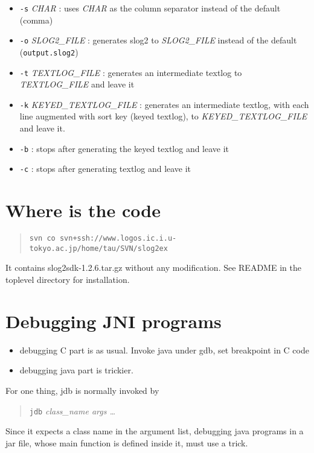 \documentclass{article}
\begin{document}
\begin{itemize}
\item {\tt -s} {\it CHAR} : uses {\it CHAR} as the column separator instead of the default (comma)
\item {\tt -o} {\it SLOG2\_FILE} : generates slog2 to {\it SLOG2\_FILE}
instead of the default ({\tt output.slog2})
\item {\tt -t} {\it TEXTLOG\_FILE} : generates an intermediate textlog to {\it TEXTLOG\_FILE} and leave it
\item {\tt -k} {\it KEYED\_TEXTLOG\_FILE} : generates an intermediate textlog, with each line augmented
with sort key (keyed textlog), to {\it KEYED\_TEXTLOG\_FILE} and leave it.
\item {\tt -b} : stops after generating the keyed textlog and leave it
\item {\tt -c} : stops after generating textlog and leave it
\end{itemize}

\appendix

\section{Where is the code}
\begin{quote}
\begin{verbatim}
svn co svn+ssh://www.logos.ic.i.u-tokyo.ac.jp/home/tau/SVN/slog2ex
\end{verbatim}
\end{quote}
It contains slog2sdk-1.2.6.tar.gz without any modification.  
See README in the toplevel directory for installation.

\section{Debugging JNI programs}\label{sec:jdb}
\begin{itemize}
\item debugging C part is as usual. Invoke java under gdb, set breakpoint in C code
\item debugging java part is trickier.
\end{itemize}

For one thing, jdb is normally invoked by
\begin{quote}
  {\tt jdb} {\it class\_name args \ldots}
\end{quote}

Since it expects a class name in the argument list, 
debugging java programs in a jar file, whose main function is defined inside it,
must use a trick.
\end{document}
